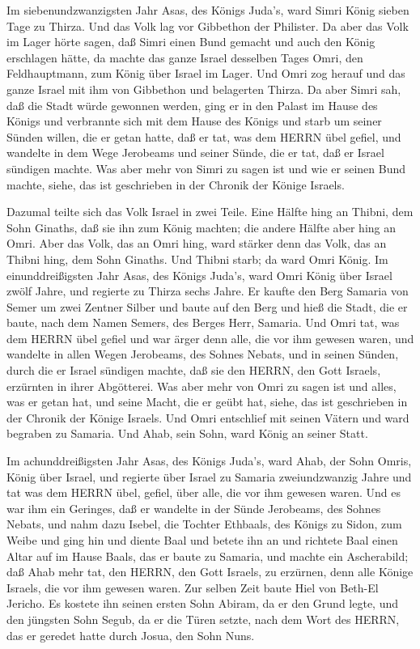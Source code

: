  Im siebenundzwanzigsten Jahr Asas, des Königs Juda's, ward
Simri König sieben Tage zu Thirza. Und das Volk lag vor Gibbethon der
Philister.  Da aber das Volk im Lager hörte sagen, daß
Simri einen Bund gemacht und auch den König erschlagen hätte, da machte
das ganze Israel desselben Tages Omri, den Feldhauptmann, zum König über
Israel im Lager.  Und Omri zog herauf und das ganze Israel
mit ihm von Gibbethon und belagerten Thirza.  Da aber Simri
sah, daß die Stadt würde gewonnen werden, ging er in den Palast im Hause
des Königs und verbrannte sich mit dem Hause des Königs und starb
 um seiner Sünden willen, die er getan hatte, daß er tat,
was dem HERRN übel gefiel, und wandelte in dem Wege Jerobeams und seiner
Sünde, die er tat, daß er Israel sündigen machte.  Was aber
mehr von Simri zu sagen ist und wie er seinen Bund machte, siehe, das
ist geschrieben in der Chronik der Könige Israels.

 Dazumal teilte sich das Volk Israel in zwei Teile. Eine
Hälfte hing an Thibni, dem Sohn Ginaths, daß sie ihn zum König machten;
die andere Hälfte aber hing an Omri.  Aber das Volk, das an
Omri hing, ward stärker denn das Volk, das an Thibni hing, dem Sohn
Ginaths. Und Thibni starb; da ward Omri König.  Im
einunddreißigsten Jahr Asas, des Königs Juda's, ward Omri König über
Israel zwölf Jahre, und regierte zu Thirza sechs Jahre.  Er
kaufte den Berg Samaria von Semer um zwei Zentner Silber und baute auf
den Berg und hieß die Stadt, die er baute, nach dem Namen Semers, des
Berges Herr, Samaria.  Und Omri tat, was dem HERRN übel
gefiel und war ärger denn alle, die vor ihm gewesen waren, 
und wandelte in allen Wegen Jerobeams, des Sohnes Nebats, und in seinen
Sünden, durch die er Israel sündigen machte, daß sie den HERRN, den Gott
Israels, erzürnten in ihrer Abgötterei.  Was aber mehr von
Omri zu sagen ist und alles, was er getan hat, und seine Macht, die er
geübt hat, siehe, das ist geschrieben in der Chronik der Könige Israels.
 Und Omri entschlief mit seinen Vätern und ward begraben zu
Samaria. Und Ahab, sein Sohn, ward König an seiner Statt.

 Im achunddreißigsten Jahr Asas, des Königs Juda's, ward
Ahab, der Sohn Omris, König über Israel, und regierte über Israel zu
Samaria zweiundzwanzig Jahre  und tat was dem HERRN übel,
gefiel, über alle, die vor ihm gewesen waren.  Und es war
ihm ein Geringes, daß er wandelte in der Sünde Jerobeams, des Sohnes
Nebats, und nahm dazu Isebel, die Tochter Ethbaals, des Königs zu Sidon,
zum Weibe und ging hin und diente Baal und betete ihn an 
und richtete Baal einen Altar auf im Hause Baals, das er baute zu
Samaria,  und machte ein Ascherabild; daß Ahab mehr tat,
den HERRN, den Gott Israels, zu erzürnen, denn alle Könige Israels, die
vor ihm gewesen waren.  Zur selben Zeit baute Hiel von
Beth-El Jericho. Es kostete ihn seinen ersten Sohn Abiram, da er den
Grund legte, und den jüngsten Sohn Segub, da er die Türen setzte, nach
dem Wort des HERRN, das er geredet hatte durch Josua, den Sohn Nuns.

